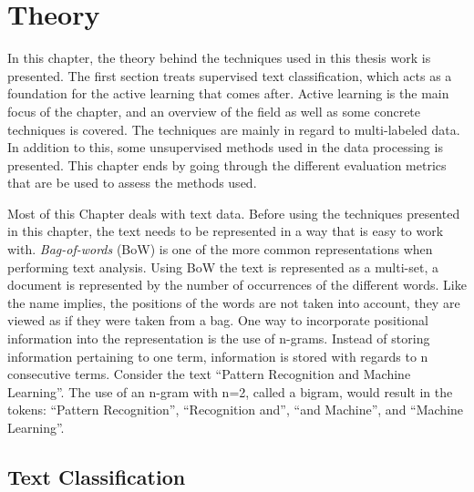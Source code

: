 \chapter{Theory}
\label{cha:theory}

In this chapter, the theory behind the techniques used in this thesis work is presented.
The first section treats supervised text classification, which acts as a foundation for the active learning that comes after.
Active learning is the main focus of the chapter, and an overview of the field as well as some concrete techniques is covered.
The techniques are mainly in regard to multi-labeled data.
In addition to this, some unsupervised methods used in the data processing is presented.
This chapter ends by going through the different evaluation metrics that are be used to assess the methods used.

Most of this Chapter deals with text data.
Before using the techniques presented in this chapter, the text needs to be represented in a way that is easy to work with.
\textit{Bag-of-words} (BoW) is one of the more common representations when performing text analysis. 
Using BoW the text is represented as a multi-set, a document is represented by the number of occurrences of the different words. 
Like the name implies, the positions of the words are not taken into account, they are viewed as if they were taken from a bag. 
One way to incorporate positional information into the representation is the use of n-grams.
Instead of storing information pertaining to one term, information is stored with regards to n consecutive terms.
Consider the text ``Pattern Recognition and Machine Learning''.
The use of an n-gram with n=2, called a bigram, would result in the tokens: ``Pattern Recognition'', ``Recognition and'', ``and Machine'', and ``Machine Learning''.

\section{Text Classification}\label{sec:text-classification}

